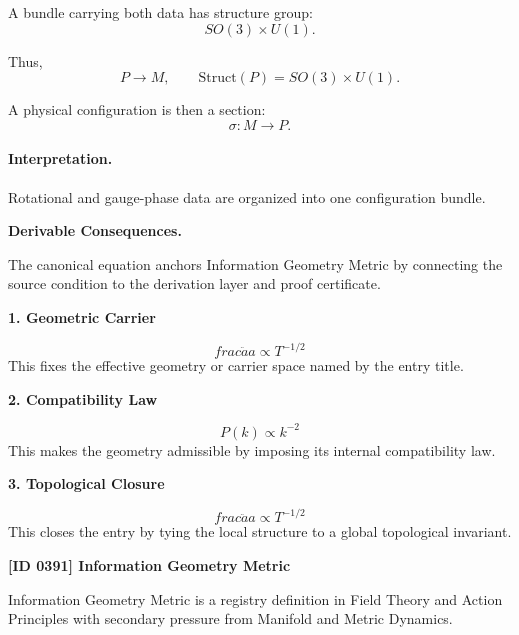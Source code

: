 A bundle carrying both data has structure group:
\begin{equation}
SO(3)\times U(1).
\end{equation}

Thus,
\begin{equation}
P\to M,
\qquad
\mathrm{Struct}(P)=SO(3)\times U(1).
\end{equation}

A physical configuration is then a section:
\begin{equation}
\boxed{
\sigma:M\to P.
}
\end{equation}

\paragraph{Interpretation.}
Rotational and gauge-phase data are organized into one configuration bundle.

\par\vspace{0.35em}
\noindent\textbf{Derivable Consequences.}\quad
\begingroup
\footnotesize
\raggedright
The canonical equation anchors Information Geometry Metric by connecting the source condition to the derivation layer and proof certificate.
\par\endgroup

\noindent\textbf{1. Geometric Carrier}\par
\[
frac{\ddot{a}}{a} \propto T^{-1/2}
\]
\noindent This fixes the effective geometry or carrier space named by the entry title.\par
\noindent\textbf{2. Compatibility Law}\par
\[
P(k) \propto k^{-2}
\]
\noindent This makes the geometry admissible by imposing its internal compatibility law.\par
\noindent\textbf{3. Topological Closure}\par
\[
frac{\ddot{a}}{a} \propto T^{-1/2}
\]
\noindent This closes the entry by tying the local structure to a global topological invariant.\par

\clearpage
\noindent\textbf{[ID 0391] Information Geometry Metric}\par
\vspace{0.35em}
\begingroup\small
{}
Information Geometry Metric is a registry definition in Field Theory and Action Principles with secondary pressure from Manifold and Metric Dynamics.

